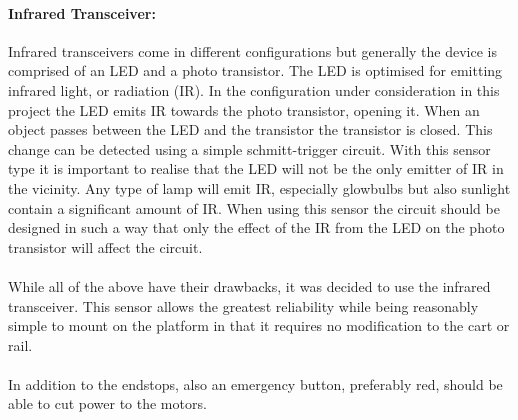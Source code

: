 \paragraph{Infrared Transceiver:} %
\label{par:infrared_transceiver}
Infrared transceivers come in different configurations but generally the device is comprised of an LED and a photo transistor.
The LED is optimised for emitting infrared light, or radiation (IR).
In the configuration under consideration in this project the LED emits IR towards the photo transistor, opening it.
When an object passes between the LED and the transistor the transistor is closed.
This change can be detected using a simple schmitt-trigger circuit. 
With this sensor type it is important to realise that the LED will not be the only emitter of IR in the vicinity.
Any type of lamp will emit IR, especially glowbulbs but also sunlight contain a significant amount of IR.
When using this sensor the circuit should be designed in such a way that only the effect of the IR from the LED on the photo transistor will affect the circuit.
\\~\\
While all of the above have their drawbacks, it was decided to use the infrared transceiver.
This sensor allows the greatest reliability while being reasonably simple to mount on the platform in that it requires no modification to the cart or rail.
\\~\\
In addition to the endstops, also an emergency button, preferably red, should be able to cut power to the motors.

